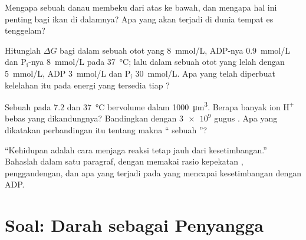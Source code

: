 \begin{exercise}[$\star\star$]\label{exo:b1:water-small-molecules:9}
Mengapa sebuah danau membeku dari atas ke bawah, dan mengapa hal ini
penting bagi ikan di dalamnya? Apa yang akan terjadi di dunia tempat es
tenggelam?
\end{exercise}

\begin{exercise}[$\star\star\star$]\label{exo:b1:water-small-molecules:10}
Hitunglah $\Delta G$ bagi   dalam sebuah  otot yang
 \qty{8}{mmol/L}, ADP-nya \qty{0.9}{mmol/L} dan
$\mathrm{P_i}$-nya \qty{8}{mmol/L} pada \qty{37}{\celsius}; lalu dalam
sebuah otot yang lelah dengan  \qty{5}{mmol/L}, ADP \qty{3}{mmol/L}
dan $\mathrm{P_i}$ \qty{30}{mmol/L}. Apa yang telah diperbuat
kelelahan itu pada energi yang tersedia tiap ?
\end{exercise}

\begin{exercise}[$\star\star\star$]\label{exo:b1:water-small-molecules:11}
Sebuah  pada  7.2 dan \qty{37}{\celsius} bervolume dalam
\qty{1000}{\micro m^3}. Berapa banyak ion $\mathrm{H^+}$ bebas yang
dikandungnya? Bandingkan dengan $\num{3e9}$ gugus . Apa
yang dikatakan perbandingan itu tentang makna `` sebuah ''?
\end{exercise}

\begin{exercise}[$\star\star\star$]\label{exo:b1:water-small-molecules:12}
``Kehidupan adalah cara menjaga reaksi tetap jauh dari
kesetimbangan.'' Bahaslah dalam satu paragraf, dengan memakai rasio
kepekatan , penggandengan, dan apa yang terjadi pada  yang 
mencapai kesetimbangan dengan ADP.
\end{exercise}

\section{Soal: Darah sebagai Penyangga}

